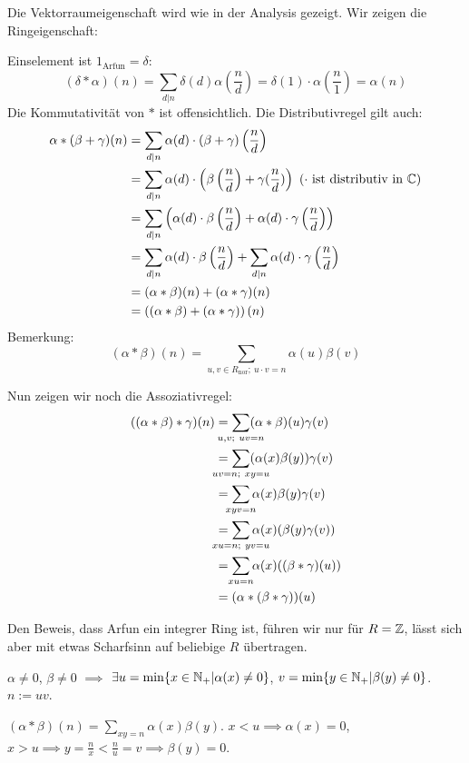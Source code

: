 \documentclass[a4paper,twoside,DIV15,BCOR12mm]{scrbook}
\begin{document}
\begin{beweis}
Die Vektorraumeigenschaft wird wie in der Analysis gezeigt. Wir
zeigen die Ringeigenschaft:

Einselement ist $1_\text{Arfun} = \delta$:
\[ (\delta*\alpha)(n) = \sum_{d|n} \delta(d)\alpha(\frac nd) = \delta(1) \cdot \alpha(\frac n1) = \alpha(n) \]
Die Kommutativität von $*$ ist offensichtlich. Die Distributivregel
gilt auch:
\begin{align*}
\alpha * (\beta + \gamma)(n)
&= \sum_{d|n} \alpha(d) \cdot (\beta + \gamma) \left(\frac nd\right)\\
&= \sum_{d|n} \alpha(d) \cdot \left(\beta\left(\frac nd\right) + \gamma(\frac nd)\right)\ (\cdot\text{ ist distributiv in } \mathbb{C}) \\
&= \sum_{d|n}\left( \alpha(d) \cdot \beta\left(\frac nd\right) + \alpha(d) \cdot \gamma\left(\frac nd\right)\right)\\
&= \sum_{d|n} \alpha(d) \cdot \beta\left(\frac nd\right) + \sum_{d|n} \alpha(d) \cdot \gamma\left(\frac nd\right)\\
&= (\alpha * \beta)(n) + (\alpha * \gamma)(n)\\
&= \left( (\alpha * \beta) + (\alpha * \gamma) \right)(n)
\end{align*}
Bemerkung:\[ (\alpha * \beta) (n) = \sum_{u,v\in R_\text{nor};\
u\cdot v = n} \alpha(u) \beta(v) \]


Nun zeigen wir noch die Assoziativregel:
\begin{align*}
((\alpha * \beta) * \gamma )(n)
&= \sum_{\mathclap{u,v;\ uv=n}} (\alpha * \beta)(u) \gamma (v) \\
&= \sum_{\mathclap{uv=n;\ xy=u}} (\alpha(x)\beta(y))\gamma(v) \\
&= \sum_{\mathclap{xyv=n}} \alpha(x)\beta(y)\gamma(v) \\
&= \sum_{\mathclap{xu=n;\ yv=u}} \alpha(x)(\beta(y)\gamma(v)) \\
&= \sum_{\mathclap{xu=n}} \alpha(x)((\beta * \gamma)(u)) \\
&= (\alpha * (\beta * \gamma))(u)
\end{align*}

Den Beweis, dass Arfun ein integrer Ring ist, führen wir nur für
$R=\mathbb{Z}$, lässt sich aber mit etwas Scharfsinn auf beliebige $R$
übertragen.

$\alpha \ne 0$, $\beta \ne 0$ $\implies$ $\exists u =
\min\{x\in\mathbb{N}_+| \alpha(x) \ne 0\}$, $v=\min\{y\in\mathbb{N}_+|\beta(y)\ne
0\}$. $n:= uv$.

$(\alpha * \beta)(n) = \sum_{xy=n} \alpha(x)\beta(y)$. $x<u\implies
\alpha(x)=0$, $x>u \implies y = \frac nx < \frac nu = v \implies
\beta(y)=0$.


\end{beweis}
\end{document}
